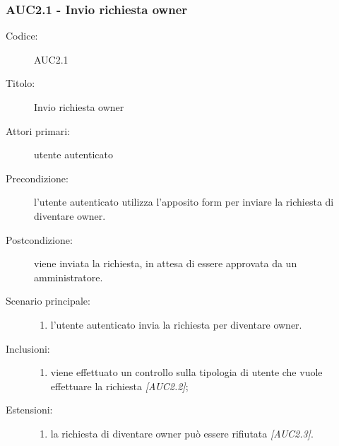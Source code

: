 \documentclass[../analisi-dei-requisiti.tex]{subfiles}
\begin{document}
\subsubsection{AUC2.1 - Invio richiesta owner}%
\label{subsub:AUC2.1}
\begin{description}
  \item[Codice:] AUC2.1
  \item[Titolo:] Invio richiesta owner
  \item[Attori primari:] utente autenticato
  \item[Precondizione:] l'utente autenticato utilizza l'apposito form per inviare la richiesta di diventare owner.
  \item[Postcondizione:] viene inviata la richiesta, in attesa di essere approvata da un amministratore.
  \item[Scenario principale:]
  \begin{enumerate}
    \item l'utente autenticato invia la richiesta per diventare owner.
  \end{enumerate}
  \item[Inclusioni:]
  \begin{enumerate}
    \item viene effettuato un controllo sulla tipologia di utente che vuole effettuare la richiesta \emph{[AUC2.2]};
  \end{enumerate}
  \item[Estensioni:]
  \begin{enumerate}
    \item la richiesta di diventare owner può essere rifiutata \emph{[AUC2.3]}.
  \end{enumerate}
\end{description}
\end{document}
